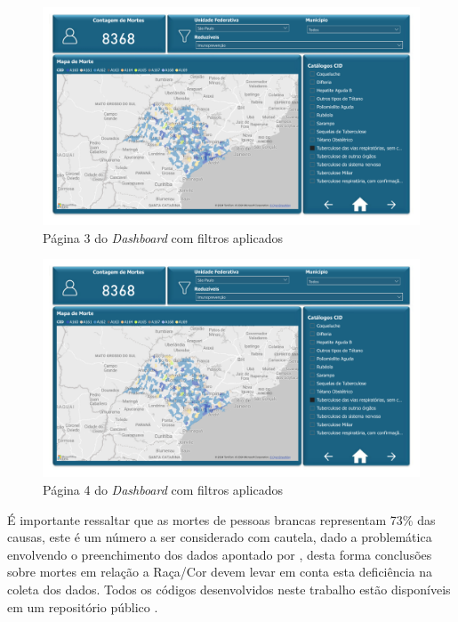 \begin{figure}[H]
	\caption{\label{fig_dash_3}Página 3 do \textit{Dashboard} com filtros aplicados}
	\begin{center}
		\includegraphics[width=\textwidth, page = 3]{USPSC-img/dash}
	\end{center}
\end{figure}

\begin{figure}[H]
	\caption{\label{fig_dash_4}Página 4 do \textit{Dashboard} com filtros aplicados}
	\begin{center}
		\includegraphics[width=\textwidth, page = 4]{USPSC-img/dash}
	\end{center}
\end{figure}

É importante ressaltar que as mortes de pessoas brancas representam 73\% das causas, este é um número a ser considerado com cautela, dado a problemática envolvendo o preenchimento dos dados apontado por , desta forma conclusões sobre mortes em relação a Raça/Cor devem levar em conta esta deficiência na coleta dos dados. Todos os códigos desenvolvidos neste trabalho estão disponíveis em um repositório público \cite{lucas_barbosa_defanti_2024_11526926}.


